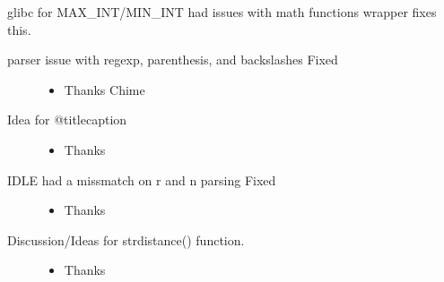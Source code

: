 \documentclass[letterpaper,10pt,english]{sphinxmanual}
\begin{document}
\sphinxAtStartPar
glibc for MAX\_INT/MIN\_INT had issues with math functions \sphinxhyphen{} wrapper fixes this.
\begin{description}
\item[{parser issue with regexp, parenthesis, and backslashes \textendash{} Fixed}] \leavevmode\begin{itemize}
\item {} 
\sphinxAtStartPar
Thanks Chime

\end{itemize}

\item[{Idea for @titlecaption}] \leavevmode\begin{itemize}
\item {} 
\sphinxAtStartPar
Thanks 

\end{itemize}

\item[{IDLE had a missmatch on r and n parsing \textendash{} Fixed}] \leavevmode\begin{itemize}
\item {} 
\sphinxAtStartPar
Thanks 

\end{itemize}

\item[{Discussion/Ideas for strdistance() function.}] \leavevmode\begin{itemize}
\item {} 
\sphinxAtStartPar
Thanks 

\end{itemize}

\end{description}
\end{document}
